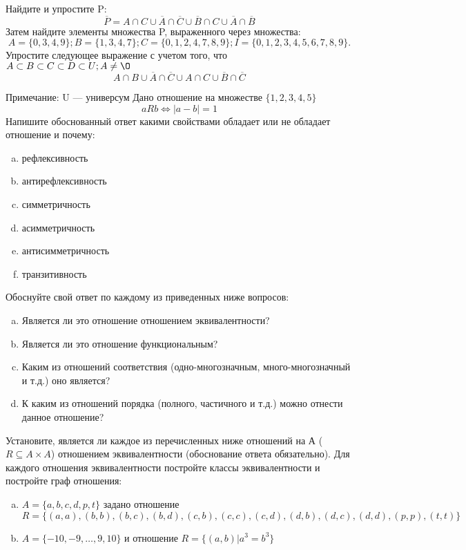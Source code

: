 \documentclass[10pt]{exam}
\begin{document}
\begin{questions}
\question
Найдите и упростите P:
\begin{equation*}
\overline{P} = A \cap C \cup \overline{A} \cap \overline{C} \cup \overline{B} \cap C \cup \overline{A} \cap \overline{B}
\end{equation*}
Затем найдите элементы множества P, выраженного через множества:
\begin{equation*}
A = \{0, 3, 4, 9\}; 
B = \{1, 3, 4, 7\};
C = \{0, 1, 2, 4, 7, 8, 9\};
I = \{0, 1, 2, 3, 4, 5, 6, 7, 8, 9\}.
\end{equation*}\question
Упростите следующее выражение с учетом того, что $A\subset B \subset C \subset D \subset U; A \neq \O$
\begin{equation*}
A \cap B \cup \overline{A} \cap \overline{C} \cup A \cap C \cup \overline{B} \cap \overline{C}
\end{equation*}

Примечание: U — универсум\question
Дано отношение на множестве $\{1, 2, 3, 4, 5\}$ 
\begin{equation*}
aRb \iff |a-b| = 1
\end{equation*}
Напишите обоснованный ответ какими свойствами обладает или не обладает отношение и почему:   
\begin{enumerate} [a)]\setcounter{enumi}{0}
\item рефлексивность
\item антирефлексивность
\item симметричность
\item асимметричность
\item антисимметричность
\item транзитивность
\end{enumerate}

Обоснуйте свой ответ по каждому из приведенных ниже вопросов:
\begin{enumerate} [a)]\setcounter{enumi}{0}
    \item Является ли это отношение отношением эквивалентности?
    \item Является ли это отношение функциональным?
    \item Каким из отношений соответствия (одно-многозначным, много-многозначный и т.д.) оно является?
    \item К каким из отношений порядка (полного, частичного и т.д.) можно отнести данное отношение?
\end{enumerate}

\question
Установите, является ли каждое из перечисленных ниже отношений на А ($R \subseteq A \times A$) отношением эквивалентности (обоснование ответа обязательно). Для каждого отношения эквивалентности постройте классы 
эквивалентности и постройте граф отношения:
\begin{enumerate} [a)]\setcounter{enumi}{0}
\item $A = \{a, b, c, d, p, t\}$ задано отношение $R = \{(a, a), (b, b), (b, c), (b, d), (c, b), (c, c), (c, d), (d, b), (d, c), (d, d), (p,p), (t,t)\}$
\item $A = \{-10, -9, … , 9, 10\}$ и отношение $R = \{(a,b)|a^{3} = b^{3}\}$


\end{enumerate}
\end{questions}
\end{document}
